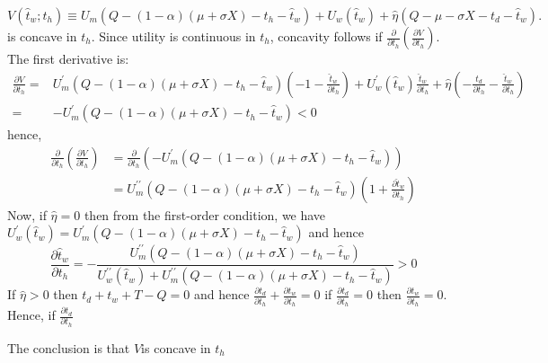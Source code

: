 \documentclass[12pt,a4paper,british]{article}
\theoremstyle{definition}
\theoremstyle{plain}
\theoremstyle{plain}
\begin{document}
\[
V\left(\hat{t}_{w};t_{h}\right)\equiv U_{m}\left(Q-\left(1-\alpha\right)\left(\mu+\sigma X\right)-t_{h}-\hat{t}_{w}\right)+U_{w}\left(\hat{t}_{w}\right)+\hat{\eta}\left(Q-\mu-\sigma X-t_{d}-\hat{t}_{w}\right).
\]
is concave in $t_{h}$. Since utility is continuous in $t_{h}$, concavity
follows if $\frac{\partial}{\partial t_{h}}\left(\frac{\partial V}{\partial t_{h}}\right)$.
The first derivative is:
\begin{align*}
\frac{\partial V}{\partial t_{h}}= & U_{m}^{\prime}\left(Q-\left(1-\alpha\right)\left(\mu+\sigma X\right)-t_{h}-\hat{t}_{w}\right)\left(-1-\frac{\hat{t}_{w}}{\partial t_{h}}\right)+U_{w}^{\prime}\left(\hat{t}_{w}\right)\frac{\hat{t}_{w}}{\partial t_{h}}+\hat{\eta}\left(-\frac{t_{d}}{\partial t_{h}}-\frac{\hat{t}_{w}}{\partial t_{h}}\right)\\
= & -U_{m}^{\prime}\left(Q-\left(1-\alpha\right)\left(\mu+\sigma X\right)-t_{h}-\hat{t}_{w}\right)<0
\end{align*}
hence,
\begin{align*}
\frac{\partial}{\partial t_{h}}\left(\frac{\partial V}{\partial t_{h}}\right) & =\frac{\partial}{\partial t_{h}}\left(-U_{m}^{\prime}\left(Q-\left(1-\alpha\right)\left(\mu+\sigma X\right)-t_{h}-\hat{t}_{w}\right)\right)\\
 & =U_{m}^{\prime\prime}\left(Q-\left(1-\alpha\right)\left(\mu+\sigma X\right)-t_{h}-\hat{t}_{w}\right)\left(1+\frac{\partial\hat{t}_{w}}{\partial t_{h}}\right)
\end{align*}
Now, if $\hat{\eta}=0$ then from the first-order condition, we have
$U_{w}^{\prime}\left(\hat{t}_{w}\right)=U_{m}^{\prime}\left(Q-\left(1-\alpha\right)\left(\mu+\sigma X\right)-t_{h}-\hat{t}_{w}\right)$
and hence
\[
\frac{\partial\hat{t}_{w}}{\partial t_{h}}=-\frac{U_{m}^{\prime\prime}\left(Q-\left(1-\alpha\right)\left(\mu+\sigma X\right)-t_{h}-\hat{t}_{w}\right)}{U_{w}^{\prime\prime}\left(\hat{t}_{w}\right)+U_{m}^{\prime\prime}\left(Q-\left(1-\alpha\right)\left(\mu+\sigma X\right)-t_{h}-\hat{t}_{w}\right)}>0
\]
If $\hat{\eta}>0$ then $t_{d}+t_{w}+T-Q=0$ and hence $\frac{\partial t_{d}}{\partial t_{h}}+\frac{\partial t_{w}}{\partial t_{h}}=0$
if $\frac{\partial t_{d}}{\partial t_{h}}=0$ then $\frac{\partial t_{w}}{\partial t_{h}}=0$.
Hence, if $\frac{\partial t_{d}}{\partial t_{h}}$

The conclusion is that $V$is concave in $t_{h}$
\end{document}
